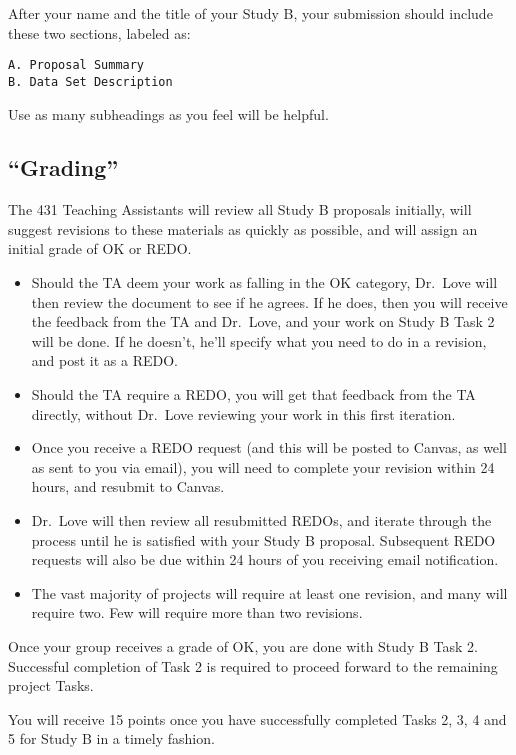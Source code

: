 \documentclass[]{book}
\begin{document}
After your name and the title of your Study B, your submission should include these two sections, labeled as:

\begin{verbatim}
A. Proposal Summary 
B. Data Set Description
\end{verbatim}

Use as many subheadings as you feel will be helpful.

\hypertarget{grading-2}{%
\subsection{``Grading''}\label{grading-2}}

The 431 Teaching Assistants will review all Study B proposals initially, will suggest revisions to these materials as quickly as possible, and will assign an initial grade of OK or REDO.

\begin{itemize}
\item
  Should the TA deem your work as falling in the OK category, Dr.~Love will then review the document to see if he agrees. If he does, then you will receive the feedback from the TA and Dr.~Love, and your work on Study B Task 2 will be done. If he doesn't, he'll specify what you need to do in a revision, and post it as a REDO.
\item
  Should the TA require a REDO, you will get that feedback from the TA directly, without Dr.~Love reviewing your work in this first iteration.
\item
  Once you receive a REDO request (and this will be posted to Canvas, as well as sent to you via email), you will need to complete your revision within 24 hours, and resubmit to Canvas.
\item
  Dr.~Love will then review all resubmitted REDOs, and iterate through the process until he is satisfied with your Study B proposal. Subsequent REDO requests will also be due within 24 hours of you receiving email notification.
\item
  The vast majority of projects will require at least one revision, and many will require two. Few will require more than two revisions.
\end{itemize}

Once your group receives a grade of OK, you are done with Study B Task 2. Successful completion of Task 2 is required to proceed forward to the remaining project Tasks.

You will receive 15 points once you have successfully completed Tasks 2, 3, 4 and 5 for Study B in a timely fashion.
\end{document}
